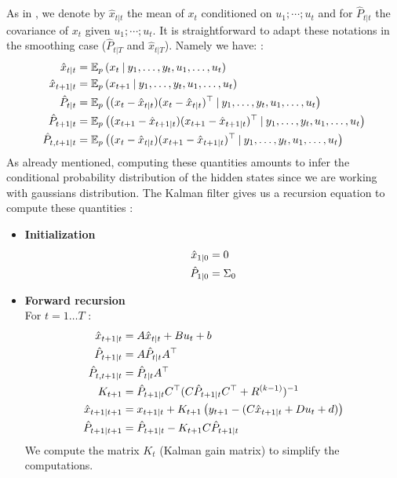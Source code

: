 As in \cite{Poly}, we denote by $\hat{x}_{t|t}$ the mean of $x_t$ conditioned on $u_1;\cdots;u_t$ and for $\hat{P}_{t|t}$ the covariance of $x_t$ given $u_1;\cdots;u_t$. It is straightforward to adapt these notations in the smoothing case ($\hat{P}_{t|T}$ and $\hat{x}_{t|T}$). Namely we have: :
\begin{align*}
  \hat{x}_{t \mathbin{\vert} t} &= \mathbb{E}_p \left(x_t \mathbin{\vert} y_1, \ldots , y_t, u_1, \ldots , u_t \right) \\
  \hat{x}_{t+1 \mathbin{\vert} t} &= \mathbb{E}_p \left(x_{t+1} \mathbin{\vert} y_1, \ldots , y_t, u_1, \ldots , u_t \right) \\
  \hat{P}_{t \mathbin{\vert} t} &= \mathbb{E}_p \left((x_t - \hat{x}_{t \mathbin{\vert} t})(x_t - \hat{x}_{t \mathbin{\vert} t})^{\top} \mathbin{\vert} y_1, \ldots , y_t, u_1, \ldots , u_t \right) \\
  \hat{P}_{t+1 \mathbin{\vert} t} &= \mathbb{E}_p \left((x_{t+1} - \hat{x}_{t+1 \mathbin{\vert} t})(x_{t+1} - \hat{x}_{t+1 \mathbin{\vert} t})^{\top} \mathbin{\vert} y_1, \ldots , y_t, u_1, \ldots , u_t \right) \\
  \hat{P}_{t,t+1 \mathbin{\vert} t} &= \mathbb{E}_p \left((x_t - \hat{x}_{t \mathbin{\vert} t})(x_{t+1} - \hat{x}_{t+1 \mathbin{\vert} t})^{\top} \mathbin{\vert} y_1, \ldots , y_t, u_1, \ldots , u_t \right) \\
\end{align*}
As already mentioned, computing these quantities amounts to infer the conditional probability distribution of the hidden states since we are working with gaussians distribution. The Kalman filter gives us a recursion equation to compute these quantities :
\begin{itemize}
  \item \textbf{Initialization}\\
    \begin{align*}
      \hat{x}_{1 \mathbin{\vert} 0} &= 0\\
      \hat{P}_{1 \mathbin{\vert} 0} &= \Sigma_0\\
    \end{align*}
  \item \textbf{Forward recursion}\\
    For $t=1 \ldots T$ :
    \begin{align*}
      \hat{x}_{t+1 \mathbin{\vert} t} &= A \hat{x}_{t \mathbin{\vert} t} + B u_t + b\\
      \hat{P}_{t+1 \mathbin{\vert} t} &= A \hat{P}_{t \mathbin{\vert} t} A^{\top}\\
      \hat{P}_{t,t+1 \mathbin{\vert} t} &= \hat{P}_{t \mathbin{\vert} t}A^{\top}\\
      K_{t+1} &= \hat{P}_{t+1 \mathbin{\vert} t}C^{\top}(C \hat{P}_{t+1 \mathbin{\vert} t} C^{\top} + R^{(k-1)})^{-1}\\
      \hat{x}_{t+1 \mathbin{\vert} t+1} &= x_{t+1 \mathbin{\vert} t} + K_{t+1} \left(y_{t+1} - (C\hat{x}_{t+1 \mathbin{\vert} t} + D u_t + d) \right)\\
      \hat{P}_{t+1 \mathbin{\vert} t+1} &= \hat{P}_{t+1 \mathbin{\vert} t} - K_{t+1} C \hat{P}_{t+1 \mathbin{\vert} t}\\
    \end{align*}
We compute the matrix $K_{t}$ (Kalman gain matrix) to simplify the computations.
\end{itemize}

